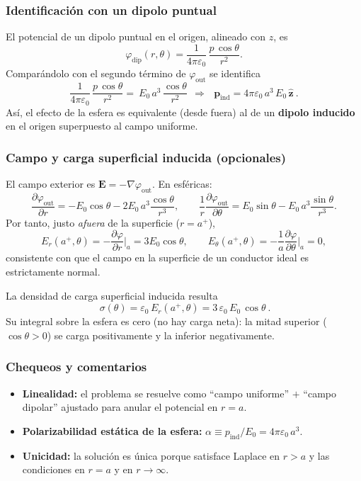 \documentclass{article}
\begin{document}
\subsubsection*{Identificación con un dipolo puntual}
El potencial de un dipolo puntual en el origen, alineado con $z$, es
\[
\varphi_{\text{dip}}(r,\theta)=\frac{1}{4\pi\varepsilon_0}\,\frac{p\,\cos\theta}{r^{2}}.
\]
Comparándolo con el segundo término de $\varphi_{\text{out}}$ se identifica
\[
\frac{1}{4\pi\varepsilon_0}\,\frac{p\,\cos\theta}{r^{2}}
=\ E_0\,a^{3}\,\frac{\cos\theta}{r^{2}}
\ \ \Longrightarrow\ \
\boxed{\ \mathbf p_{\text{ind}}=4\pi\varepsilon_0\,a^{3}\,E_0\,\hat{\mathbf z}\ }.
\]
Así, el efecto de la esfera es equivalente (desde fuera) al de un \textbf{dipolo inducido} en el origen superpuesto al campo uniforme.

\subsubsection*{Campo y carga superficial inducida (opcionales)}
El campo exterior es $\mathbf E=-\nabla\varphi_{\text{out}}$. En esféricas:
\[
\frac{\partial \varphi_{\text{out}}}{\partial r}
=-E_0\cos\theta -2E_0\,a^{3}\frac{\cos\theta}{r^{3}},
\qquad
\frac{1}{r}\frac{\partial \varphi_{\text{out}}}{\partial\theta}
=E_0\sin\theta -E_0\,a^{3}\frac{\sin\theta}{r^{3}}.
\]
Por tanto, justo \emph{afuera} de la superficie ($r=a^{+}$),
\[
E_r(a^+,\theta)=-\frac{\partial\varphi}{\partial r}\bigg|_{a}
=3E_0\cos\theta,
\qquad
E_\theta(a^+,\theta)=-\frac{1}{a}\frac{\partial\varphi}{\partial\theta}\bigg|_{a}=0,
\]
consistente con que el campo en la superficie de un conductor ideal es estrictamente normal.

La densidad de carga superficial inducida resulta
\[
\boxed{\ \sigma(\theta)=\varepsilon_0\,E_r(a^+,\theta)=3\,\varepsilon_0\,E_0\,\cos\theta\ }.
\]
Su integral sobre la esfera es cero (no hay carga neta): la mitad superior ($\cos\theta>0$) se carga positivamente y la inferior negativamente.

\subsubsection*{Chequeos y comentarios}
\begin{itemize}
\item \textbf{Linealidad:} el problema se resuelve como “campo uniforme” $+$
“campo dipolar” ajustado para anular el potencial en $r=a$.
\item \textbf{Polarizabilidad estática de la esfera:} $\alpha\equiv p_{\text{ind}}/E_0=4\pi\varepsilon_0\,a^{3}$.
\item \textbf{Unicidad:} la solución es única porque satisface Laplace en $r>a$ y las condiciones en $r=a$ y en $r\to\infty$.
\end{itemize}
\end{document}
